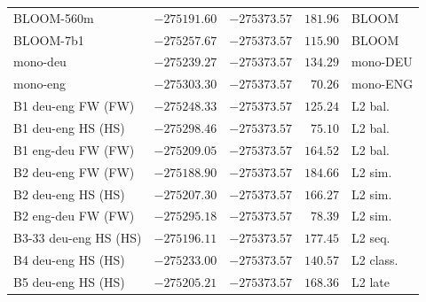 \begin{table}[!ht]
\begin{tabular}{lrrrl}
    BLOOM-560m & $-275191.60$ & $-275373.57$ & $181.96$ & BLOOM \\
    BLOOM-7b1 & $-275257.67$ & $-275373.57$ & $115.90$ & BLOOM \\
    mono-deu & $-275239.27$ & $-275373.57$ & $134.29$ & mono-DEU \\
    mono-eng & $-275303.30$ & $-275373.57$ & $70.26$ & mono-ENG \\
    B1 deu-eng FW (FW) & $-275248.33$ & $-275373.57$ & $125.24$ & L2 bal. \\
    B1 deu-eng HS (HS) & $-275298.46$ & $-275373.57$ & $75.10$ & L2 bal. \\
    B1 eng-deu FW (FW) & $-275209.05$ & $-275373.57$ & $164.52$ & L2 bal. \\
    B2 deu-eng FW (FW) & $-275188.90$ & $-275373.57$ & $184.66$ & L2 sim. \\
    B2 deu-eng HS (HS) & $-275207.30$ & $-275373.57$ & $166.27$ & L2 sim. \\
    B2 eng-deu FW (FW) & $-275295.18$ & $-275373.57$ & $78.39$ & L2 sim. \\
    B3-33 deu-eng HS (HS) & $-275196.11$ & $-275373.57$ & $177.45$ & L2 seq. \\
    B4 deu-eng HS (HS) & $-275233.00$ & $-275373.57$ & $140.57$ & L2 class. \\
    B5 deu-eng HS (HS) & $-275205.21$ & $-275373.57$ & $168.36$ & L2 late \\
    \bottomrule
  \end{tabular}
\end{table}

\newpage 

